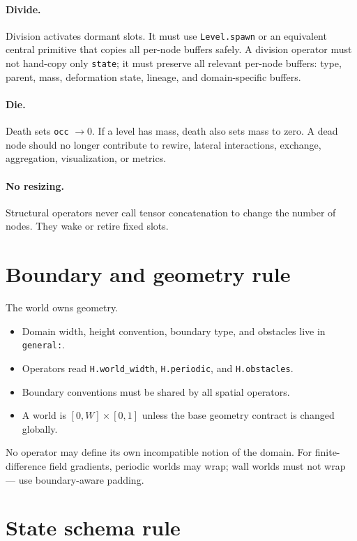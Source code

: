 \documentclass[11pt]{article}
\newcommand{\code}[1]{\texttt{#1}}
\begin{document}
\paragraph{Divide.}
Division activates dormant slots. It must use \code{Level.spawn} or an equivalent
central primitive that copies all per-node buffers safely. A division operator must
not hand-copy only \code{state}; it must preserve all relevant per-node buffers:
type, parent, mass, deformation state, lineage, and domain-specific buffers.

\paragraph{Die.}
Death sets \code{occ} $\to 0$. If a level has mass, death also sets mass to zero. A
dead node should no longer contribute to rewire, lateral interactions, exchange,
aggregation, visualization, or metrics.

\paragraph{No resizing.}
Structural operators never call tensor concatenation to change the number of nodes.
They wake or retire fixed slots.

\section{Boundary and geometry rule}

The world owns geometry.
\begin{itemize}\itemsep2pt
\item Domain width, height convention, boundary type, and obstacles live in
\code{general:}.
\item Operators read \code{H.world\_width}, \code{H.periodic}, and \code{H.obstacles}.
\item Boundary conventions must be shared by all spatial operators.
\item A world is $[0,W]\times[0,1]$ unless the base geometry contract is changed
globally.
\end{itemize}
No operator may define its own incompatible notion of the domain. For
finite-difference field gradients, periodic worlds may wrap; wall worlds must not
wrap --- use boundary-aware padding.

\section{State schema rule}
\end{document}
